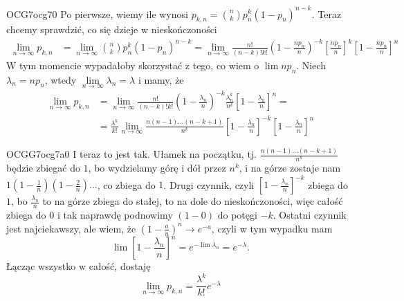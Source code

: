 \documentclass{article}
\begin{document}
\begin{ocg}{OCG7}{ocg7}{0}
Po pierwsze, wiemy ile wynosi $p_{k,n}={n\choose k}p_n^{k}(1-p_n)^{n-k}$. Teraz chcemy sprawdzić, co się dzieje w nieskończoności
\begin{align*}
    \lim\limits_{n\to\infty}p_{k,n}&=\lim\limits_{n\to\infty}{n\choose k}p_n^{k}(1-p_n)^{n-k}=\lim\limits_{n\to\infty}\frac{n!}{(n-k)!k!}(1-\frac{np_n}{n})^{-k}\left[\frac{np_n}{n}\right]^{k}\left[1-\frac{np_n}{n}\right]^n
\end{align*}
W tym momencie wypadałoby skorzystać z tego, co wiem o $\lim np_n$. Niech $\lambda_n=np_n$, wtedy $\lim\limits_{n\to\infty}\lambda_n=\lambda$ i mamy, że
\begin{align*}
    \lim\limits_{n\to\infty}p_{k,n}&=\lim\limits_{n\to\infty}\frac{n!}{(n-k)!k!}(1-\frac{\lambda_n}{n})^{-k}\frac{\lambda_n^k}{n^k}\left[1-\frac{\lambda_n}{n}\right]^n=\\
    &=\frac{\lambda^k}{k!}\lim\limits_{n\to\infty}\frac{n(n-1)...(n-k+1)}{n^k}\left[1-\frac{\lambda_n}{n}\right]^{-k}\left[1-\frac{\lambda_n}{n}\right]^n
\end{align*}
\end{ocg}


\begin{ocg}{OCGG7}{ocg7a}{0}
I teraz to jest tak. Ułamek na początku, tj. $\frac{n(n-1)...(n-k+1)}{n^k}$ będzie zbiegać do $1$, bo wydzielamy górę i dół przez $n^k$, i na górze zostaje nam $1(1-\frac1n)(1-\frac2n)...$, co zbiega do $1$. Drugi czynnik, czyli $\left[1-\frac{\lambda_n}{n}\right]^{-k}$ zbiega do $1$, bo $\frac{\lambda_n}{n}$ to na górze zbiega do stałej, to na dole do nieskończoności, więc całość zbiega do $0$ i tak naprawdę podnowimy $(1-0)$ do potęgi $-k$. Ostatni czynnik jest najciekawszy, ale wiem, że $(1-\frac{a}{n})^n\to e^{-a}$, czyli w tym wypadku mam
$$\lim\left[1-\frac{\lambda_n}{n}\right]^n=e^{-\lim\lambda_n}=e^{-\lambda}.$$
Łącząc wszystko w całość, dostaję
$$\lim\limits_{n\to\infty}p_{k,n}=\frac{\lambda^k}{k!}e^{-\lambda}$$
\end{ocg}
\end{document}
